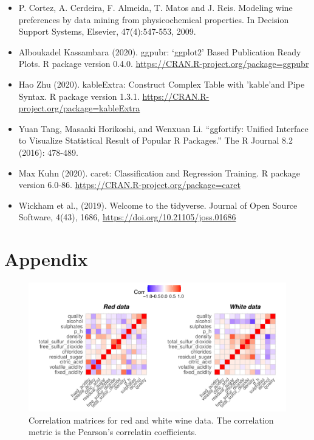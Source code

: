 \documentclass[letterpaper,11pt,twocolumn,twoside,]{pinp}
\providecommand{\tightlist}{%
  \setlength{\itemsep}{0pt}\setlength{\parskip}{0pt}}
\begin{document}
\begin{itemize}
\tightlist
\item
  P. Cortez, A. Cerdeira, F. Almeida, T. Matos and J. Reis. Modeling
  wine preferences by data mining from physicochemical properties. In
  Decision Support Systems, Elsevier, 47(4):547-553, 2009.
\item
  Alboukadel Kassambara (2020). ggpubr: `ggplot2' Based Publication
  Ready Plots. R package version 0.4.0.
  \url{https://CRAN.R-project.org/package=ggpubr}
\item
  Hao Zhu (2020). kableExtra: Construct Complex Table with 'kable'and
  Pipe Syntax. R package version 1.3.1.
  \url{https://CRAN.R-project.org/package=kableExtra}
\item
  Yuan Tang, Masaaki Horikoshi, and Wenxuan Li. ``ggfortify: Unified
  Interface to Visualize Statistical Result of Popular R Packages.'' The
  R Journal 8.2 (2016): 478-489.
\item
  Max Kuhn (2020). caret: Classification and Regression Training. R
  package version 6.0-86. \url{https://CRAN.R-project.org/package=caret}
\item
  Wickham et al., (2019). Welcome to the tidyverse. Journal of Open
  Source Software, 4(43), 1686,
  \url{https://doi.org/10.21105/joss.01686}
\end{itemize}

\hypertarget{appendix}{%
\section{Appendix}\label{appendix}}

\begin{figure}[H]

{\centering \includegraphics{DATA2X02_group_files/figure-latex/unnamed-chunk-8-1} 

}

\caption{Correlation matrices for red and white wine data. The correlation metric is the Pearson's correlatin coefficients.}\label{fig:unnamed-chunk-8}
\end{figure}
\end{document}

